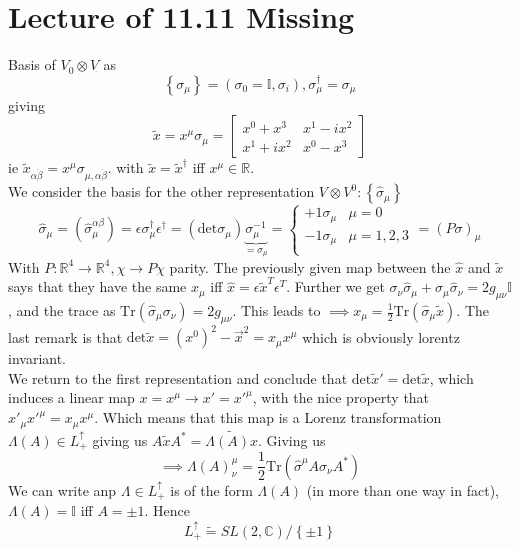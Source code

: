 \documentclass{report}
\begin{document}
\section*{Lecture of 11.11 Missing}
Basis of $V_0 \otimes V_{\dot{ } } $ as \[
\left\{ \sigma_\mu \right\} = \left( \sigma_0 = \mathbb{I}, \sigma_i \right) , \sigma_\mu^\dagger=\sigma_\mu
\] giving \[
\tilde{x} = x^{\mu} \sigma_\mu = 
\begin{bmatrix}
  x^{0} + x^{3} & x^{1} -i x^{2} \\
  x^{1} + i x^2 & x^{0} - x^3
\end{bmatrix}
\] 
ie $\tilde{x}_{\alpha \dot{\beta} } = x^{\mu} \sigma_{\mu, \alpha \dot{\beta} } $. with $\tilde{x} = \tilde{x}^\dagger$ iff $x^{\mu} \in \mathbb{R}$.\\
We consider the basis for the other representation $V^{\dot{ } } \otimes V^{0} : \left\{ \hat{\sigma} _\mu \right\}   $ \[
\hat{\sigma}_\mu = \left( \hat{\sigma}_\mu ^{\dot{\alpha} \beta}  \right) = \epsilon \sigma_\mu^\dagger \epsilon^\dagger = \left( \text{det} \sigma_\mu \right) \underbrace{\sigma_\mu^{-1} }_{=\sigma_\mu}
= \begin{cases}
  +1 \sigma_\mu & \mu = 0 \\
  -1 \sigma_\mu & \mu = 1,2,3  \\
\end{cases} = \left( P\sigma \right) _\mu
\] 
With $P: \mathbb{R}^{4} \to \mathbb{R}^{4} , \chi \to P\chi$ parity.
The previously given map between the $\hat{x}$ and $\tilde{x}$ says that they have the same $x_\mu$ iff $\hat{x} = \epsilon \tilde{x}^{T} \epsilon^{T} $. Further we get $\sigma_\nu \hat{\sigma}_\mu + \sigma_\mu \hat{\sigma}_\nu = 2 g_{\mu \nu} \mathbb{I}$, and the trace as $\text{Tr}\left( \hat{\sigma}_\mu \sigma_\nu \right) = 2 g_{\mu\nu} $. This leads to $\implies x_\mu = \frac{1}{2} \text{Tr}\left( \hat{\sigma}_\mu \tilde{x} \right) $. The last remark is that $\text{det} \tilde{x} = \left( x^{0}  \right) ^2 - \vec{x}^2 = x_\mu x^{\mu} $ which is obviously lorentz invariant.\\
We return to the first representation and conclude that $\text{det} \tilde{x}' = \text{det} \tilde{x}$, which induces a linear map $x = x^{\mu} \to x' = x'^{\mu} $, with the nice property that $x'_\mu x'^{\mu} = x_\mu x^{\mu} $. Which means that this map is a Lorenz transformation $\Lambda\left( A \right) \in L_+^{\uparrow} $ giving us $A \tilde{x} A^{*} = \tilde{\Lambda\left( A \right) x}$. Giving us \[
\implies \Lambda\left( A \right) ^{\mu}_\nu = \frac{1}{2} \text{Tr}\left( \hat{\sigma}^{\mu} A \sigma_\nu A^{*} \right)  
\] We can write anp $\Lambda \in L_+^{\uparrow} $ is of the form $\Lambda\left( A \right) $ (in more than one way in fact), $\Lambda\left( A \right) = \mathbb{I}$ iff $A = \pm 1$. Hence \[
L_+^{\uparrow} \tilde{=} SL\left( 2, \mathbb{C} \right) / \left\{ \pm 1 \right\} 
\] 
\end{document}
